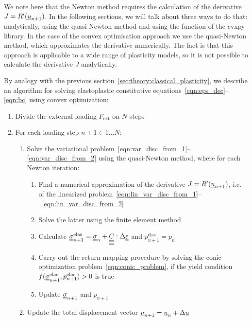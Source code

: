\documentclass[12pt]{article}
\begin{document}
We note here that the Newton method requires the calculation of the derivative $J = R^\prime(\underline{u}_{n+1})$. In the following sections, we will talk about three ways to do that: analytically, using the quasi-Newton method and using the  function of the cvxpy library. In the case of the convex optimisation approach we use the quasi-Newton method, which approximates the derivative numerically. The fact is that this approach is applicable to a wide range of plasticity models, so it is not possible to calculate the derivative $J$ analytically.

By analogy with the previous section~\ref{sec:theory:classical_plasticity}, we describe an algorithm for solving elastoplastic constitutive equations~\eqref{eqn:eps_dec}--\eqref{eqn:bc} using convex optimization:
\begin{enumerate}
    \item Divide the external loading $F_\text{ext}$ on $N$ steps
    \item For each loading step $n+1 \in {1 \dots N}$:
    \begin{enumerate}
        \item Solve the variational problem~\eqref{eqn:var_disc_from_1}--\eqref{eqn:var_disc_from_2} using the quasi-Newton method, where for each Newton iteration:
        \begin{enumerate}
            \item Find a numerical approximation of the derivative $J = R^\prime(\underline{u}_{n+1})$, i.e. of the linearized problem~\eqref{eqn:lin_var_disc_from_1}--~\eqref{eqn:lin_var_disc_from_2}
            \item Solve the latter using the finite element method 
            \item Calculate $\underline{\underline{\sigma}}_{n+1}^{\text{elas}} = \underline{\underline{\sigma}}_n + \underline{\underline{\underline{\underline{C_{}}}}} : \Delta\underline{\underline{\varepsilon}}$ and $p_{n+1}^\text{elas} = p_n$
            \item Carry out the return-mapping procedure by solving the conic optimization problem~\eqref{eqn:conic_problem}, if the yield condition $f(\underline{\underline{\sigma}}_{n+1}^{\text{elas}}, p_{n+1}^\text{elas}) > 0$ is true
            \item Update $\underline{\underline{\sigma}}_{n+1}$ and $p_{n+1}$
        \end{enumerate}
        \item Update the total displacement vector $\underline{u}_{n+1} = \underline{u}_n + \Delta\underline{u}$
    \end{enumerate}
\end{enumerate}
\end{document}
